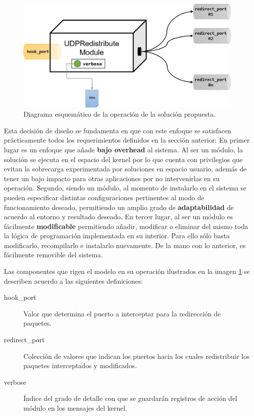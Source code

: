 	\begin{figure}[!h]
		\centering
		\includegraphics[scale=.55]{imagenes/udpredistributemoduleDiagram.png}
		\caption{Diagrama esquemático de la operación de la solución propuesta.}
		\label{fig:modeloUDPRedistribuyeModule}
	\end{figure}

Esta decisión de diseño se fundamenta en que con este enfoque se satisfacen prácticamente todos los requerimientos definidos en la sección anterior: En primer lugar es un enfoque que añade \textbf{bajo overhead} al sistema. Al ser un módulo, la solución se ejecuta en el espacio del kernel por lo que cuenta con privilegios que evitan la sobrecarga experimentada por soluciones en espacio usuario, además de tener un bajo impacto para otras aplicaciones por no intervenirlas en su operación. Segundo, siendo un módulo, al momento de instalarlo en el sistema se pueden especificar distintas configuraciones pertinentes al modo de funcionamiento deseado, permitiendo un amplio grado de \textbf{adaptabilidad} de acuerdo al entorno y resultado deseado. En tercer lugar, al ser un módulo es fácilmente \textbf{modificable} permitiendo añadir, modificar o eliminar del mismo toda la lógica de programación implementada en su interior. Para ello sólo basta modificarlo, recompilarlo e instalarlo nuevamente. De la mano con lo anterior, es fácilmente removible del sistema.

Las componentes que rigen el modelo en su operación ilustrados en la imagen \ref{fig:modeloUDPRedistribuyeModule} se describen acuerdo a las siguientes definiciones:


\begin{description}
\item[hook\_port] Valor que determina el puerto a interceptar para la redirección de paquetes.
\item[redirect\_port] Colección de valores que indican los puertos hacia los cuales redistribuir los paquetes interceptados y modificados.
\item[verbose] Índice del grado de detalle con que se guardarán registros de acción del módulo en los mensajes del kernel.
\end{description}

